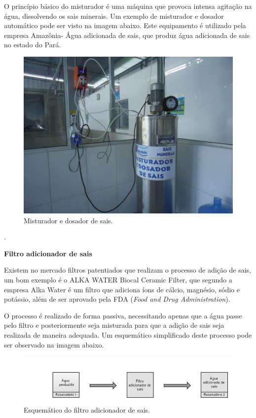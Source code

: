O princípio básico do misturador é uma máquina que provoca intensa agitação na água, dissolvendo os sais minerais. Um 
exemplo de misturador e dosador automático pode ser visto na imagem abaixo. Este equipamento é utilizado pela empresa
Amazônia- Água adicionada de sais, que produz água adicionada de sais no estado do Pará.

\begin{figure}[!htbp]
  \centering
  \includegraphics[scale=0.6]{editaveis/figuras/dosador_sais}
  \caption[Misturador e dosador de sais]{Misturador e dosador de sais. \footnotemark}
  \label{funcionamento_adicao_sais}
\end{figure}
.
\FloatBarrier


\begin{center}
\textbf{Filtro adicionador de sais}
\end{center}

Existem no mercado filtros patentiados que realizam o processo de adição de sais, um bom exemplo é o ALKA WATER Biocal Ceramic 
Filter, que segundo a empresa Alka Water é um filtro que adiciona íons de cálcio, magnésio, sódio e potássio, além de ser 
aprovado pela FDA (\textit{Food and Drug Administration}).

O processo é realizado de forma passiva, necessitando apenas que a água passe pelo filtro e posteriormente seja misturada para
que a adição de sais seja realizada de maneira adequada. Um esquemático simplificado deste processo pode ser observado na imagem abaixo.

\begin{figure}[!htbp]
  \centering
  \includegraphics[scale=0.6]{editaveis/figuras/esquema_filtro_adicionador_sais}
  \caption[Esquemático do filtro adicionador de sais]{Esquemático do filtro adicionador de sais.}
  \label{esquema_filtro_adicionador_sais}
\end{figure}
\FloatBarrier


